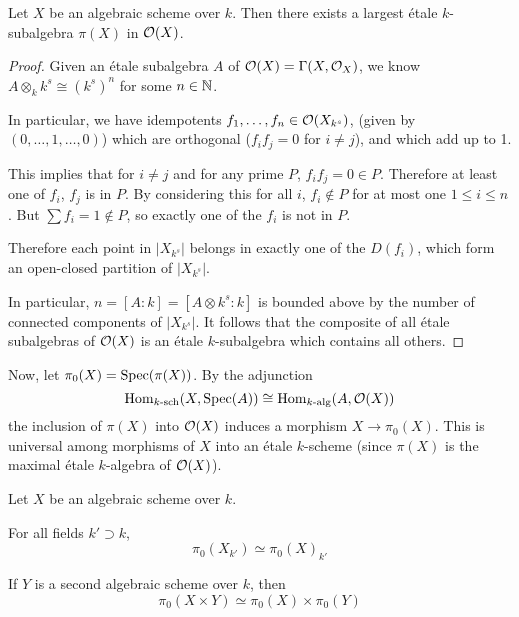 \documentclass{memoir}
\begin{document}
\begin{proposition}[1.29]
	Let $X$ be an algebraic scheme over $k$. Then there exists a largest
	étale $k$-subalgebra $\pi(X)$ in $\mathcal{O}(X)$.
\end{proposition}

\begin{proof}
	Given an étale subalgebra $A$ of $\mathcal{O}(X) = \Gamma(X, \mathcal{O}_X)$, we know
	$A \otimes_k k^s \cong (k^s)^n$ for some $n \in \mathbb{N}$.
	
	In particular, we have idempotents $f_1, \ldots, f_n \in \mathcal{O}(X_{k^s})$,
	(given by
	$(0, \ldots, 1, \ldots, 0)$) which are orthogonal ($f_i f_j = 0$ for
	$i \ne j$), and which add up to 1.
	
	This implies that for $i\ne j$ and for any prime $P$,
	$f_i f_j = 0 \in P$. Therefore at least one of $f_i$, $f_j$ is in $P$.
	By considering this for all $i$, $f_i \notin P$ for at most one
	$1 \le i \le n$. But $\sum f_i = 1 \notin P$, so exactly one of the
	$f_i$ is not in $P$.
	
	Therefore each point in $|X_{k^s}|$ belongs in exactly one of
	the $D(f_i)$, which form an open-closed partition of $|X_{k^s}|$.
	
	In particular, $n = [A:k] = [A \otimes k^s : k]$ is bounded above
	by the number of connected components of $|X_{k^s}|$.
	It follows that the composite of all étale subalgebras of $\mathcal{O}(X)$ is
	an étale $k$-subalgebra which contains all others.
	
	
\end{proof}

Now, let $\pi_0(X) = \operatorname{Spec}(\pi(X))$. By the adjunction
$$\operatorname{Hom}_{k\text{-sch}}(X, \operatorname{Spec}(A)) \cong \operatorname{Hom}_{k\text{-alg}}(A, \mathcal{O}(X))$$
the inclusion of $\pi(X)$ into
$\mathcal{O}(X)$ induces a morphism $X \to \pi_0(X)$. This is universal among
morphisms of $X$ into an étale $k$-scheme (since $\pi(X)$ is the maximal
étale $k$-algebra of $\mathcal{O}(X)$).

\begin{proposition}[1.30]
	Let $X$ be an algebraic scheme over $k$.
	
	For all fields $k' \supset k$,
	$$\pi_0(X_{k'}) \simeq \pi_0(X)_{k'}$$
	
	If $Y$ is a second algebraic scheme over $k$, then
	$$\pi_0(X \times Y) \simeq \pi_0(X) \times \pi_0(Y)$$
\end{proposition}
\end{document}
